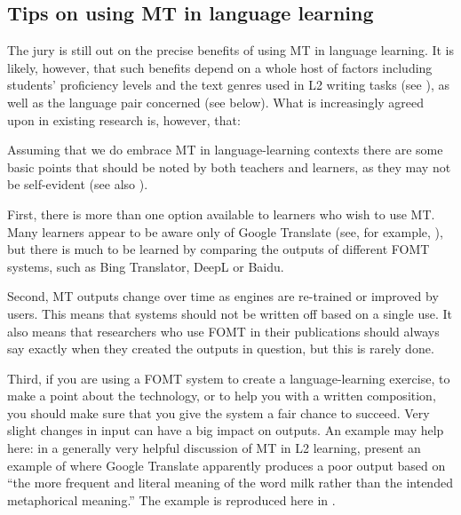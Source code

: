 \documentclass[output=paper,colorlinks,citecolor=brown,
]{langscibook}
\begin{document}
\subsection{Tips on using MT in language learning}\largerpage

The jury is still out on the precise benefits of using MT in language learning. It is likely, however, that such benefits depend on a whole host of factors including students’ proficiency levels and the text genres used in L2 writing tasks (see \citealt{ChungAhn2021}), as well as the language pair concerned (see  below). What is increasingly agreed upon in existing research is, however, that:


Assuming that we do embrace MT in language-learning contexts there are some basic points that should be noted by both teachers and learners, as they may not be self-evident (see also \citealt{Bowker2020}).

First, there is more than one option available to learners who wish to use MT. Many learners appear to be aware only of Google Translate (see, for example, \citealt{DorstBouman2022}), but there is much to be learned by comparing the outputs of different FOMT systems, such as Bing Translator, DeepL or Baidu.

Second, MT outputs change over time as engines are re-trained or improved by users. This means that systems should not be written off based on a single use. It also means that researchers who use FOMT in their publications should always say exactly when they created the outputs in question, but this is rarely done.

Third, if you are using a FOMT system to create a language-learning exercise, to make a point about the technology, or to help you with a written composition, you should make sure that you give the system a fair chance to succeed. Very slight changes in input can have a big impact on outputs. An example may help here: in a generally very helpful discussion of MT in L2 learning,  \citet[785]{DucarSchocket2018} present an example of where Google Translate apparently produces a poor output based on “the more frequent and literal meaning of the word milk rather than the intended metaphorical meaning.”  The example is reproduced here in .
\end{document}
